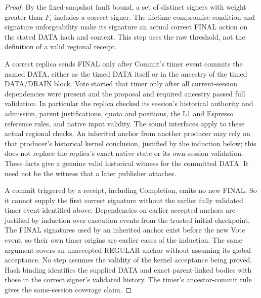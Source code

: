 \documentclass[11pt,a4paper]{article}
\begin{document}
\begin{proof}
By the fixed-snapshot fault bound, a set of distinct signers with weight
greater than $F_i$ includes a correct signer. The lifetime compromise
condition and signature unforgeability make its signature an actual
correct FINAL action on the stated DATA hash and context. This step uses
the raw threshold, not the definition of a valid regional receipt.

A correct replica sends FINAL only after Commit's timer event commits the
named DATA, either as the timed DATA itself or in the ancestry of the
timed DATA/DRAIN block. Vote started that timer only after all
current-session dependencies were present and the proposal and required
ancestry passed full validation. In particular the replica checked its
session's historical authority and admission, parent justifications,
quota and positions, the L1 and Espresso reference rules, and native
input validity. The sound interfaces apply to these actual regional
checks. An inherited anchor from another producer may rely on that
producer's historical kernel conclusion, justified by the induction
below; this does not replace the replica's exact native state or its
own-session validation. These facts give a genuine valid historical
witness for the committed DATA. It need not be the witness that a later
publisher attaches.

A commit triggered by a receipt, including Completion, emits no new
FINAL. So it cannot supply the first correct signature without the
earlier fully validated timer event identified above. Dependencies on
earlier accepted anchors are justified by induction over execution
events from the trusted initial checkpoint. The FINAL signatures used by
an inherited anchor exist before the new Vote event, so their own timer
origins are earlier cases of the induction. The same argument covers an
unaccepted REGULAR anchor without assuming its global acceptance. No step
assumes the validity of the kernel acceptance being proved. Hash binding
identifies the supplied DATA and exact parent-linked bodies with those in
the correct signer's validated history. The timer's ancestor-commit rule
gives the same-session coverage claim.
\end{proof}
\end{document}
